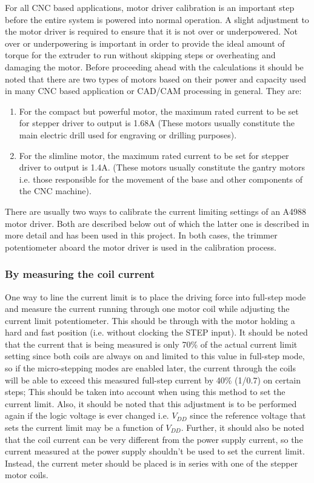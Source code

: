 For all CNC based applications, motor driver calibration is an important step before the entire system is powered into normal operation. A slight adjustment to the motor driver is required to ensure that it is not over or underpowered. Not over or underpowering is important in order to provide the ideal amount of torque for the extruder to run without skipping steps or overheating and damaging the motor. Before proceeding ahead with the calculations it should be noted that there are two types of motors based on their power and capacity used in many CNC based application or CAD/CAM processing in general. They are:

\begin{enumerate}
 \item For the compact but powerful motor, the maximum rated current to be set for stepper driver to output is 1.68A (These motors usually constitute the main electric drill used for engraving or drilling purposes).
 \item For the slimline motor, the maximum rated current to be set for stepper driver to output is 1.4A. (These motors usually constitute the gantry motors i.e. those responsible for the movement of the base and other components of the CNC machine).
\end{enumerate}

There are usually two ways to calibrate the current limiting settings of an A4988 motor driver. Both are described below out of which the latter one is described in more detail and has been used in this project. In both cases, the trimmer potentiometer aboard the motor driver is used in the calibration process.

\subsubsection*{By measuring the coil current}

One way to line the current limit is to place the driving force into full-step mode and measure the current running through one motor coil while adjusting the current limit potentiometer. This should be through with the motor holding a hard and fast position (i.e. without clocking the STEP input). It should be noted that the current that is being measured is only 70\% of the actual current limit setting since both coils are always on and limited to this value in full-step mode, so if the micro-stepping modes are enabled later, the current through the coils will be able to exceed this measured full-step current by 40\% (1/0.7) on certain steps; This should be taken into account when using this method to set the current limit. Also, it should be noted that this adjustment is to be performed again if the logic voltage is ever changed i.e. $V_{DD}$ since the reference voltage that sets the current limit may be a function of $V_{DD}$. Further, it should also be noted that the coil current can be very different from the power supply current, so the current measured at the power supply shouldn’t be used to set the current limit. Instead, the current meter should be placed is in series with one of the stepper motor coils.

